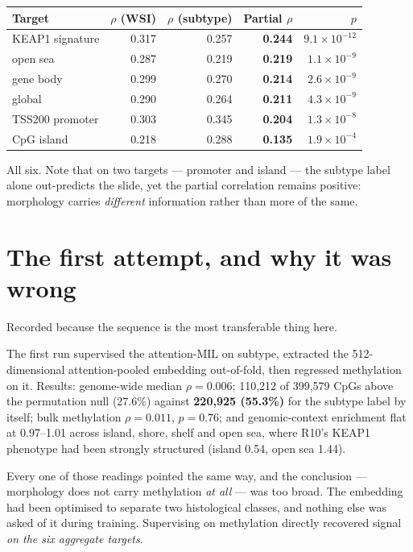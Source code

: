 \documentclass[11pt,a4paper]{article}
\begin{document}
\begin{center}
\begin{tabular}{@{}lrrrr@{}}
\toprule
\textbf{Target} & \textbf{$\rho$ (WSI)} & \textbf{$\rho$ (subtype)} & \textbf{Partial $\rho$} & \textbf{$p$} \\
\midrule
KEAP1 signature & 0.317 & 0.257 & \textbf{0.244} & $9.1\times10^{-12}$ \\
open sea & 0.287 & 0.219 & \textbf{0.219} & $1.1\times10^{-9}$ \\
gene body & 0.299 & 0.270 & \textbf{0.214} & $2.6\times10^{-9}$ \\
global & 0.290 & 0.264 & \textbf{0.211} & $4.3\times10^{-9}$ \\
TSS200 promoter & 0.303 & 0.345 & \textbf{0.204} & $1.3\times10^{-8}$ \\
CpG island & 0.218 & 0.288 & \textbf{0.135} & $1.9\times10^{-4}$ \\
\bottomrule
\end{tabular}
\end{center}

All six. Note that on two targets --- promoter and island --- the subtype label alone
out-predicts the slide, yet the partial correlation remains positive: morphology carries
\emph{different} information rather than more of the same.

\section{The first attempt, and why it was wrong}

Recorded because the sequence is the most transferable thing here.

The first run supervised the attention-MIL on subtype, extracted the 512-dimensional
attention-pooled embedding out-of-fold, then regressed methylation on it. Results: genome-wide
median $\rho = 0.006$; 110{,}212 of 399{,}579 CpGs above the permutation null (27.6\%) against
\textbf{220{,}925 (55.3\%)} for the subtype label by itself; bulk methylation
$\rho = 0.011$, $p = 0.76$; and genomic-context enrichment flat at 0.97--1.01 across island,
shore, shelf and open sea, where R10's KEAP1 phenotype had been strongly structured
(island 0.54, open sea 1.44).

Every one of those readings pointed the same way, and the conclusion --- morphology does not
carry methylation \emph{at all} --- was too broad. The embedding had been optimised to separate two
histological classes, and nothing else was asked of it during training. Supervising on methylation
directly recovered signal \emph{on the six aggregate targets}.
\end{document}

